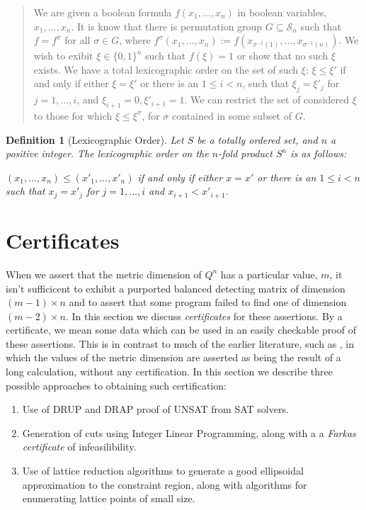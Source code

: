 \documentclass{article}
\newcommand{\cS}{\mathcal{S}}
\newtheorem{definition}{Definition}
\begin{document}
\begin{quotation}
  We are given a boolean formula $f(x_1, \dots, x_n)$ in boolean
  variables, $x_1, \dots, x_n$.  It is know that there is permutation
  group $G \subseteq \cS_n$ such that $f = f^\sigma$ for all
  $\sigma \in G$, where
  $f^\sigma(x_1, \dots, x_n) := f(x_{\sigma^{-1}(1)}, \dots,
  x_{\sigma^{-1}(n)})$.  We wish to exibit $\xi \in \{0,1\}^n$ such
  that $f(\xi) = 1$ or show that no such $\xi$ exists.  We have a
  total lexicographic order on the set of such $\xi$: $\xi \le \xi'$
  if and only if either $\xi = \xi'$ or there is an $1 \le i < n$,
  such that $\xi_j = \xi'_j$ for $j=1, \dots, i$, and
  $\xi_{i+1} = 0, \xi'_{i+1} = 1$.  We can restrict the set of
  considered $\xi$ to those for which $\xi \le \xi^\sigma$, for
  $\sigma$ contained in some subset of $G$.
\end{quotation}
\begin{definition}[Lexicographic Order]
  Let $S$ be a totally ordered set, and $n$ a positive integer.  The
  \emph{lexicographic order} on the $n$-fold product $S^n$ is as
  follows:

  $(x_1, \dots, x_n) \le (x'_1, \dots, x'_n)$ if and only if either $x
  = x'$ or there is an $1 \le i < n$ such that $x_j = x'_j$ for $j=1,
  \dots, i$ and $x_{i+1} < x'_{i+1}$.
\end{definition}
\section{Certificates}
\label{sec:certificates}

When we assert that the metric dimension of $Q^n$ has a particular
value, $m$, it isn't sufficicent to exhibit a purported balanced
detecting matrix of dimension $(m-1) \times n$ and to assert that some
program failed to find one of dimension $(m-2) \times n$.  In this
section we discuss \emph{certificates} for these assertions.  By a
certificate, we mean some data which can be used in an easily
checkable proof of these assertions.  This is in contrast to much of
the earlier literature, such as \cite{beardon2013resolving}, in which
the values of the metric dimension are asserted as being the result of
a long calculation, without any certification.  In this section we
describe three possible approaches to obtaining such certification:
\begin{enumerate}
\item Use of DRUP and DRAP proof of UNSAT from SAT solvers.
\item Generation of cuts using Integer Linear Programming, along with
  a a \emph{Farkas certificate} of infeasilibility.
\item Use of lattice reduction algorithms to generate a good
  ellipsoidal approximation to the constraint region, along with
  algorithms for enumerating lattice points of small size.
\end{enumerate}
\end{document}
